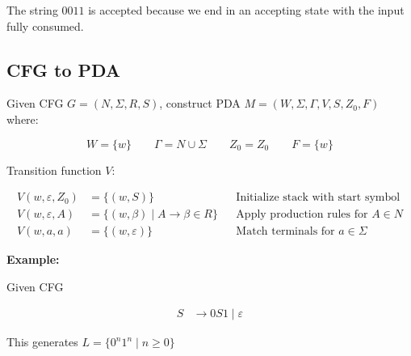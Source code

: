 \documentclass[12pt,a4paper,openany]{article}
\begin{document}
The string $0011$ is accepted because we end in an accepting state with the input fully consumed.


\subsection{CFG to PDA}

Given CFG $G = (N, \Sigma, R, S)$, construct PDA $M = (W, \Sigma, \Gamma, V, S, Z_0, F)$ where:

$$W = \{w\} \qquad \Gamma = N \cup \Sigma \qquad Z_0 = Z_0 \qquad F = \{w\}$$

Transition function $V$:

\begin{align*}
V(w, \varepsilon, Z_0) &= \{(w, S)\} && \text{Initialize stack with start symbol} \\
V(w, \varepsilon, A) &= \{(w, \beta) \mid A \to \beta \in R\} && \text{Apply production rules for } A \in N \\
V(w, a, a) &= \{(w, \varepsilon)\} && \text{Match terminals for } a \in \Sigma
\end{align*}

\textbf{Example:}

Given CFG

\begin{align*}
S &\to 0S1 \mid \varepsilon
\end{align*}

This generates $L = \{0^n 1^n \mid n \geq 0\}$
\end{document}
